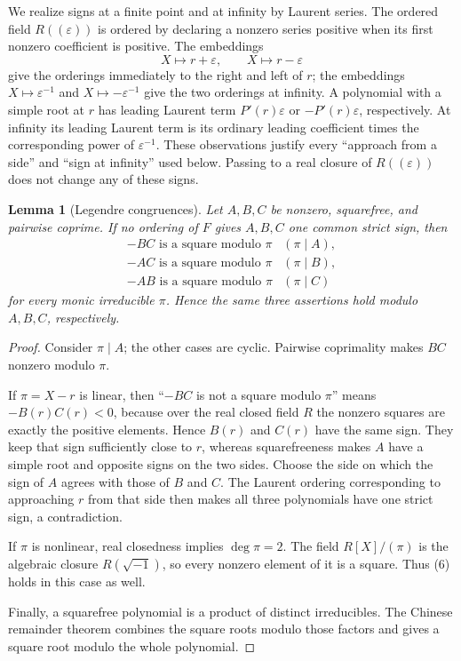 \documentclass[uplatex,dvipdfmx]{jsarticle}
\newtheorem{lemma}[theorem]{Lemma}
\theoremstyle{definition}
\theoremstyle{remark}
\begin{document}
We realize signs at a finite point and at infinity by Laurent series.  The
ordered field $R((\varepsilon))$ is ordered by declaring a nonzero series
positive when its first nonzero coefficient is positive.  The embeddings
\[
  X\longmapsto r+\varepsilon,\qquad
  X\longmapsto r-\varepsilon
\]
give the orderings immediately to the right and left of $r$; the embeddings
$X\mapsto\varepsilon^{-1}$ and
$X\mapsto-\varepsilon^{-1}$ give the two orderings at infinity.  A polynomial
with a simple root at $r$ has leading Laurent term
$P'(r)\varepsilon$ or $-P'(r)\varepsilon$, respectively.  At infinity its
leading Laurent term is its ordinary leading coefficient times the
corresponding power of $\varepsilon^{-1}$.  These observations justify every
``approach from a side'' and ``sign at infinity'' used below.  Passing to a
real closure of $R((\varepsilon))$ does not change any of these signs.

\begin{lemma}[Legendre congruences]\label{lem:legendre-congruences}
Let $A,B,C$ be nonzero, squarefree, and pairwise coprime.  If no ordering of
$F$ gives $A,B,C$ one common strict sign, then
\[
\begin{array}{ll}
 -BC\text{ is a square modulo }\pi &(\pi\mid A),\\
 -AC\text{ is a square modulo }\pi &(\pi\mid B),\\
 -AB\text{ is a square modulo }\pi &(\pi\mid C)
\end{array}                                             \tag{6}
\]
for every monic irreducible $\pi$.  Hence the same three assertions hold
modulo $A,B,C$, respectively.
\end{lemma}
\begin{proof}
Consider $\pi\mid A$; the other cases are cyclic.  Pairwise coprimality makes
$BC$ nonzero modulo $\pi$.

If $\pi=X-r$ is linear, then ``$-BC$ is not a square modulo $\pi$'' means
$-B(r)C(r)<0$, because over the real closed field $R$ the nonzero squares are
exactly the positive elements.  Hence $B(r)$ and $C(r)$ have the same sign.
They keep that sign sufficiently close to $r$, whereas squarefreeness makes
$A$ have a simple root and opposite signs on the two sides.  Choose the side
on which the sign of $A$ agrees with those of $B$ and $C$.  The Laurent
ordering corresponding to approaching $r$ from that side then makes all
three polynomials have one strict sign, a contradiction.

If $\pi$ is nonlinear, real closedness implies $\deg\pi=2$.  The field
$R[X]/(\pi)$ is the algebraic closure $R(\sqrt{-1})$, so every nonzero element
of it is a square.  Thus (6) holds in this case as well.

Finally, a squarefree polynomial is a product of distinct irreducibles.
The Chinese remainder theorem combines the square roots modulo those factors
and gives a square root modulo the whole polynomial.
\end{proof}
\end{document}

